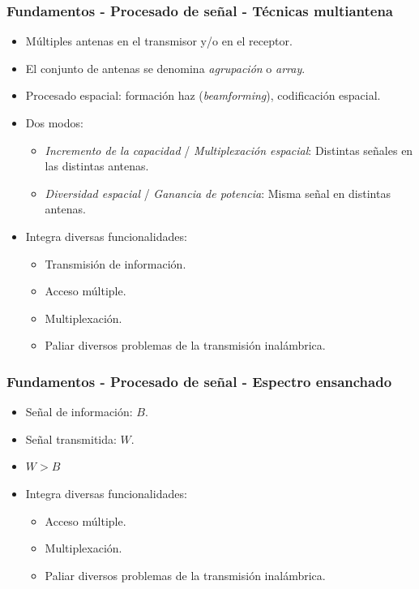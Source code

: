 \documentclass{beamer}
\begin{document}
\begin{frame}
\frametitle{Fundamentos - Procesado de señal - Técnicas multiantena}

\begin{itemize}
\item Múltiples antenas en el transmisor y/o en el receptor.
\item El conjunto de antenas se denomina \textit{agrupación} o \textit{array}.
\item Procesado espacial: formación haz (\textit{beamforming}), codificación espacial.
\item {
	Dos modos:
	\begin{itemize}
	\item \textit{Incremento de la capacidad} / \textit{Multiplexación espacial}: Distintas señales en las distintas antenas.
	\item \textit{Diversidad espacial} / \textit{Ganancia de potencia}: Misma señal en distintas antenas.
	\end{itemize}
}
\item {
	Integra diversas funcionalidades:
	\begin{itemize}
	\item Transmisión de información.
	\item Acceso múltiple.
	\item Multiplexación.
	\item Paliar diversos problemas de la transmisión inalámbrica.
	\end{itemize}
}
\end{itemize}
\end{frame}

\begin{frame}
\frametitle{Fundamentos - Procesado de señal - Espectro ensanchado}

\begin{itemize}
\item Señal de información: $B$.
\item Señal transmitida: $W$.
\item $W > B$
\item {
	Integra diversas funcionalidades:
	\begin{itemize}
	\item Acceso múltiple.
	\item Multiplexación.
	\item Paliar diversos problemas de la transmisión inalámbrica.
	\end{itemize}
}
\end{itemize}
\end{frame}
\end{document}
